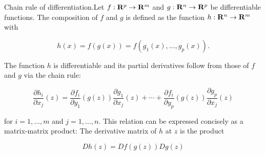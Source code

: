 Chain rule of differentiation.Let \(f:{\bf R}^{p}\to{\bf R}^{m}\) and \(g:{\bf R}^{n}\to{\bf R}^{p}\) be differentiable functions. The composition of \(f\) and \(g\) is defined as the function \(h:{\bf R}^{n}\to{\bf R}^{m}\) with

\[h(x)=f(g(x))=f(g_{1}(x),\ldots,g_{p}(x)).\]

The function \(h\) is differentiable and its partial derivatives follow from those of \(f\) and \(g\) via the chain rule:

\[\frac{\partial h_{i}}{\partial x_{j}}(z)=\frac{\partial f_{i}}{\partial y_{1} }(g(z))\frac{\partial g_{1}}{\partial x_{j}}(z)+\cdots+\frac{\partial f_{i}} {\partial y_{p}}(g(z))\frac{\partial g_{p}}{\partial x_{j}}(z)\]

for \(i=1,\ldots,m\) and \(j=1,\ldots,n\). This relation can be expressed concisely as a matrix-matrix product: The derivative matrix of \(h\) at \(z\) is the product

\[Dh(z)=Df(g(z))Dg(z)\] 